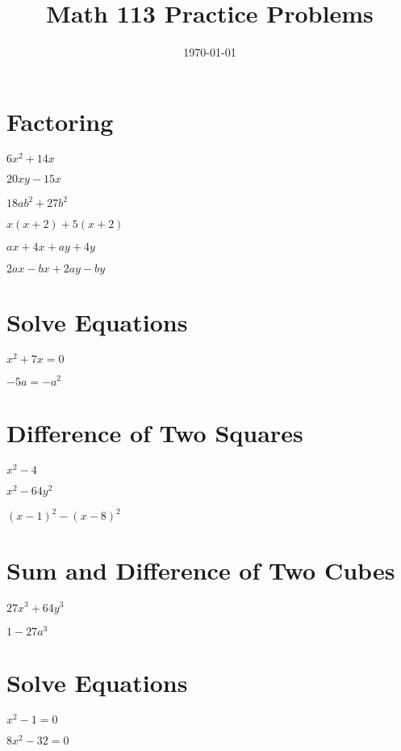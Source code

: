 \documentclass[fleqn,addpoints]{exam}
\title{Math 113 Practice Problems}
\author{}
\date{\today}
\begin{document}
\maketitle

\section{Factoring}

\begin{questions}

\question \(6x^2 + 14x\)

\question \(20xy - 15x\)

\question \(18ab^2 + 27b^2\)

\question \( x(x + 2) + 5(x + 2) \)

\question \( ax + 4x + ay + 4y \)

\question \( 2ax - bx + 2ay - by \)

\section{Solve Equations}

\question \( x^2 + 7x = 0 \)

\question \( -5a = -a^2 \)

\section{Difference of Two Squares}

\question \( x^2 - 4 \)

\question \( x^2 - 64y^2 \)

\question \( (x - 1)^2 - (x - 8)^2 \)

\section{Sum and Difference of Two Cubes}

\question \( 27x^3 + 64y^3 \)

\question \( 1 - 27a^3\)

\section{Solve Equations}

\question \( x^2 - 1 = 0 \)

\question \( 8x^2 - 32 = 0 \)

\end{questions}
\end{document}
